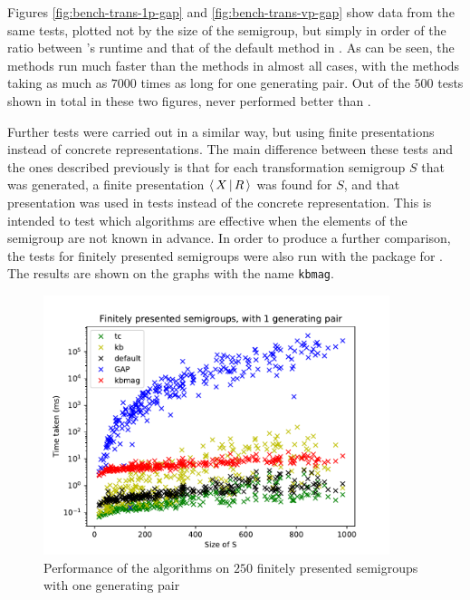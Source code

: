 Figures \ref{fig:bench-trans-1p-gap} and \ref{fig:bench-trans-vp-gap} show data
from the same tests, plotted not by
the size of the semigroup, but simply in order of the ratio between \GAP{}'s
runtime and that of the default method in \libsemigroups{}.  As can be
seen, the \libsemigroups{} methods run much faster than the \GAP{} methods in
almost all cases, with the \GAP{} methods taking as much as $7000$ times as long
for one generating pair.  Out of the $500$ tests shown in total in these two
figures, \GAP{} never performed better than \libsemigroups{}.

Further tests were carried out in a similar way, but using finite presentations
instead of concrete representations.  The main difference between these
tests and the ones described previously is that for each transformation
semigroup $S$ that was generated, a finite presentation $\left\langle \, X \, \middle| \, R \, \right\rangle$ was found
for $S$, and that presentation was used in tests instead of the concrete
representation.  This is intended to test which algorithms are effective
when the elements of the semigroup are not known in advance.
In order to produce a further comparison, the tests for finitely presented
semigroups were also run with the \kbmag{} package for \GAP{} \cite{kbmag}.
The results are shown on the graphs with the name \texttt{kbmag}.

\begin{figure}[p]
  \centering
  \includegraphics[width=0.9\textwidth]{pics/ch-pairs/bench-fp-1p-times}
  \caption[Benchmark: all algorithms, finitely presented, 1 pair]
  {Performance of the algorithms on $250$ finitely presented semigroups
    with one generating pair}
  \label{fig:bench-fp-1p-times}
\end{figure}

